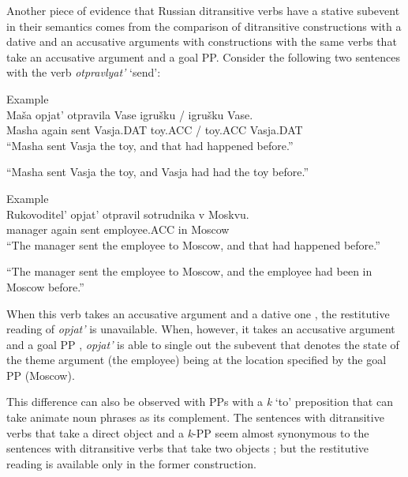 \documentclass[output=paper,modfonts,nonflat,
 hidelinks
]{langsci/langscibook}
\begin{document}
Another piece of evidence that Russian ditransitive verbs have a stative subevent in their semantics comes from the comparison of ditransitive constructions with a dative and an accusative arguments with constructions with the same verbs that take an accusative argument and a goal PP. Consider the following two sentences with the verb \textit{otpravlyat’} ‘send’:


 \ea\label{ex:bondarenko:}
{Example}\\

\gll Maša opjat’ otpravila Vase igrušku / igrušku Vase.\\
     Masha again sent Vasja.DAT toy.ACC / toy.ACC Vasja.DAT\\
\ea          “Masha sent Vasja the toy, and that had happened before.”

\ex       *“Masha sent Vasja the toy, and Vasja had had the toy before.”
\z
\z


 \ea\label{ex:bondarenko:}
{Example}\\

\gll Rukovoditel’ opjat’ otpravil sotrudnika v Moskvu.\\
     manager again sent employee.ACC in Moscow\\
\ea     “The manager sent the employee to Moscow, and that had   happened before.”

\ex     “The manager sent the employee to Moscow, and the employee   had been in   Moscow before.”
\z
\z


When this verb takes an accusative argument and a dative one , the restitutive reading of \textit{opjat’} is unavailable. When, however, it takes an accusative argument and a goal PP , \textit{opjat’} is able to single out the subevent that denotes the state of the theme argument (the employee) being at the location specified by the goal PP (Moscow).



This difference can also be observed with PPs with a \textit{k} ‘to’ preposition that can take animate noun phrases as its complement. The sentences with ditransitive verbs that take a direct object and a \textit{k}{}-PP  seem almost synonymous to the sentences with ditransitive verbs that take two objects ; but the restitutive reading is available only in the former construction.
\end{document}
